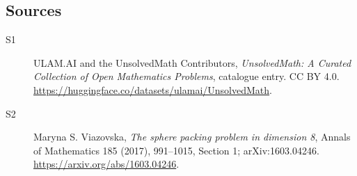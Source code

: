 \documentclass[11pt]{article}
\begin{document}
\subsection{Sources}
\begin{description}
\item[\hypertarget{source:statement:1}{S1}] ULAM.AI and the UnsolvedMath Contributors, \emph{UnsolvedMath: A Curated Collection of Open Mathematics Problems}, catalogue entry. CC BY 4.0. \url{https://huggingface.co/datasets/ulamai/UnsolvedMath}.
\item[\hypertarget{source:statement:2}{S2}] Maryna S. Viazovska, \emph{The sphere packing problem in dimension 8}, Annals of Mathematics 185 (2017), 991--1015, Section 1; arXiv:1603.04246. \url{https://arxiv.org/abs/1603.04246}.
\end{description}
\label{end:statement}
\end{document}
